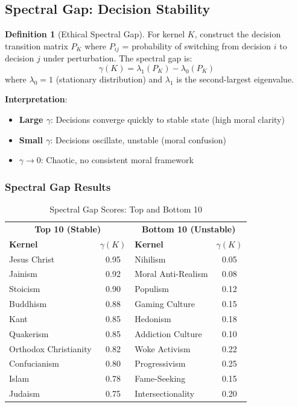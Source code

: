 \documentclass[11pt,a4paper]{article}
\theoremstyle{definition}
\newtheorem{definition}[theorem]{Definition}
\theoremstyle{remark}
\begin{document}
\subsection{Spectral Gap: Decision Stability}

\begin{definition}[Ethical Spectral Gap]
\label{def:spectral}
For kernel $K$, construct the decision transition matrix $P_K$ where $P_{ij}$ = probability of switching from decision $i$ to decision $j$ under perturbation. The spectral gap is:
\begin{equation}
    \gamma(K) = \lambda_1(P_K) - \lambda_0(P_K)
    \label{eq:spectral}
\end{equation}
where $\lambda_0 = 1$ (stationary distribution) and $\lambda_1$ is the second-largest eigenvalue.
\end{definition}

\textbf{Interpretation}:
\begin{itemize}
    \item \textbf{Large $\gamma$}: Decisions converge quickly to stable state (high moral clarity)
    \item \textbf{Small $\gamma$}: Decisions oscillate, unstable (moral confusion)
    \item $\gamma \to 0$: Chaotic, no consistent moral framework
\end{itemize}

\subsubsection{Spectral Gap Results}

\begin{table}[H]
\centering
\caption{Spectral Gap Scores: Top and Bottom 10}
\label{tab:spectral-results}
\begin{tabular}{@{}lc|lc@{}}
\toprule
\multicolumn{2}{c|}{\textbf{Top 10 (Stable)}} & \multicolumn{2}{c}{\textbf{Bottom 10 (Unstable)}} \\
\textbf{Kernel} & $\gamma(K)$ & \textbf{Kernel} & $\gamma(K)$ \\
\midrule
Jesus Christ & 0.95 & Nihilism & 0.05 \\
Jainism & 0.92 & Moral Anti-Realism & 0.08 \\
Stoicism & 0.90 & Populism & 0.12 \\
Buddhism & 0.88 & Gaming Culture & 0.15 \\
Kant & 0.85 & Hedonism & 0.18 \\
Quakerism & 0.85 & Addiction Culture & 0.10 \\
Orthodox Christianity & 0.82 & Woke Activism & 0.22 \\
Confucianism & 0.80 & Progressivism & 0.25 \\
Islam & 0.78 & Fame-Seeking & 0.15 \\
Judaism & 0.75 & Intersectionality & 0.20 \\
\bottomrule
\end{tabular}
\end{table}
\end{document}
